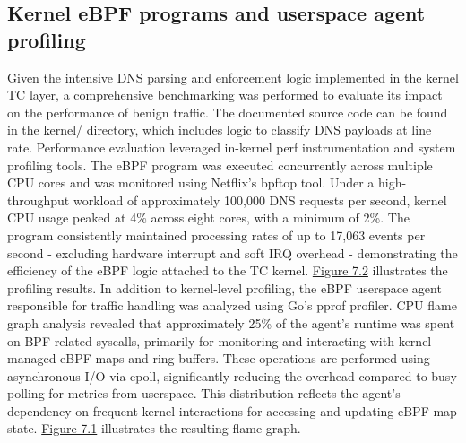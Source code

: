 \documentclass [11pt, proquest] {uwthesis}[2020/02/24]
\begin{document}
\subsection{Kernel eBPF programs and userspace agent profiling}
Given the intensive DNS parsing and enforcement logic implemented in the kernel TC layer, a comprehensive benchmarking was performed to evaluate its impact on the performance of benign traffic. The documented source code can be found in the kernel/ directory, which includes logic to classify DNS payloads at line rate. Performance evaluation leveraged in-kernel perf instrumentation and system profiling tools.
The eBPF program was executed concurrently across multiple CPU cores and was monitored using Netflix’s bpftop tool. Under a high-throughput workload of approximately 100,000 DNS requests per second, kernel CPU usage peaked at 4\% across eight cores, with a minimum of 2\%. The program consistently maintained processing rates of up to 17,063 events per second - excluding hardware interrupt and soft IRQ overhead - demonstrating the efficiency of the eBPF logic attached to the TC kernel. \hyperref[fig:c3]{Figure 7.2} illustrates the profiling results.
In addition to kernel-level profiling, the eBPF userspace agent responsible for traffic handling was analyzed using Go’s pprof profiler. CPU flame graph analysis revealed that approximately 25\% of the agent’s runtime was spent on BPF-related syscalls, primarily for monitoring and interacting with kernel-managed eBPF maps and ring buffers. These operations are performed using asynchronous I/O via epoll, significantly reducing the overhead compared to busy polling for metrics from userspace. This distribution reflects the agent’s dependency on frequent kernel interactions for accessing and updating eBPF map state. \hyperref[fig:c4]{Figure 7.1} illustrates the resulting flame graph.



\end{document}
